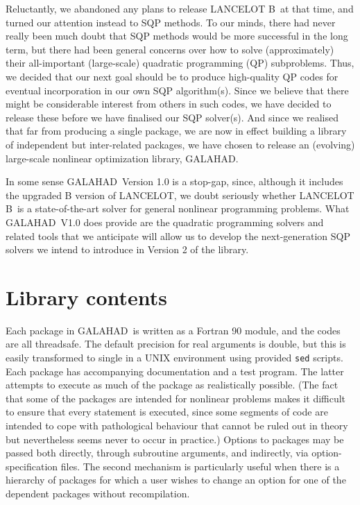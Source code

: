 \documentclass[acmtocl,acmnow]{acmtrans2m}
\newcommand{\gal}{{\sf GALAHAD}}
\newcommand{\lan}{{\sf LANCELOT}}
\newcommand{\lanb}{{\sf LANCELOT B}}
\newcommand{\resetcounters}{\setcounter{equation}{0} \setcounter{figure}{0} 
 \setcounter{table}{0}}
\newcommand{\lsection}[1]{\section{#1} \resetcounters \label{#1}}
\begin{document}
Reluctantly, we abandoned any plans to release \lanb\ at that time, and turned
our attention instead to SQP methods. To our minds, there had never
really been much doubt that SQP methods would be more successful in the
long term, but there had been  general concerns over 
how to solve (approximately) their all-important (large-scale) quadratic 
programming (QP) subproblems. Thus, we decided that our next goal
should be to produce high-quality QP codes for eventual incorporation 
in our own SQP algorithm(s). Since we believe that there might
be considerable interest from others in such codes, we have decided to release
these before we have finalised our SQP solver(s). And since we realised that
far from producing a single package, we are now in effect building a 
library of independent but inter-related packages, we have chosen to
release an (evolving) large-scale nonlinear optimization library, \gal.

In some sense \gal\ Version 1.0 is a stop-gap, since, although
it includes the upgraded B version of \lan, we doubt seriously whether 
\lanb\ is a state-of-the-art solver for general nonlinear programming
problems. What \gal\ V1.0 does provide are the quadratic programming solvers
and related tools that we anticipate will allow us to develop the 
next-generation SQP solvers 
we intend to introduce in Version 2 of the library.


\lsection{Library contents}

Each package in \gal\ is written as a Fortran 90 module, and the codes
are all threadsafe. The default
precision for real arguments is double, but this is easily transformed
to single in a UNIX environment using provided {\tt sed} scripts. 
Each package has accompanying
documentation and a test program. The latter attempts to execute as 
much of the package as
realistically possible. (The fact that some of the packages are
intended for nonlinear problems makes it difficult to ensure that
every statement is executed, since some segments of code are
intended to cope with pathological behaviour that cannot be ruled out
in theory but nevertheless seems never to occur in practice.)
Options to packages may be passed both directly, through subroutine arguments,
and indirectly, via option-specification files. The second mechanism is
particularly useful when there is a hierarchy of packages for which
a user wishes to change an option for one of the dependent packages without
recompilation.
\end{document}
